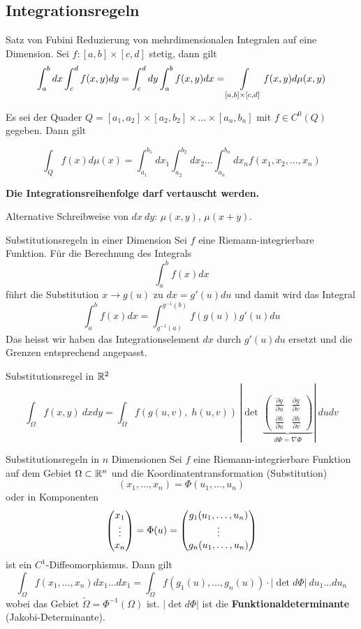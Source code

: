 \subsection{Integrationsregeln}

\begin{Satz}{Satz von Fubini}{}
    Reduzierung von mehrdimensionalen Integralen auf eine Dimension. Sei $f: [a,b] \times [c, d]$ stetig, dann gilt
    \[ \int_a^b dx \int_c^d f(x, y) dy = \int_c^d dy \int_a^b f(x, y) dx = \int\displaylimits_{[a,b] \times [c, d]} f(x, y) d\mu(x, y)   \]

    Es sei der Quader $Q = [a_1,a_2] \times [a_2, b_2] \times \dots \times [a_n, b_n]$ mit $f \in C^0(Q)$ gegeben. Dann gilt

    \[
        \int_Q f(x) d\mu(x) = \int_{a_1}^{b_1} dx_1 \int_{a_2}^{b_2} dx_2 \dots \int_{a_n}^{b_n} dx_n f(x_1, x_2,...,x_n)
    \]
    
    \textbf{Die Integrationsreihenfolge darf vertauscht werden.}
\end{Satz}

Alternative Schreibweise von $dx ~ dy$: $\mu(x, y)$, $\mu(x+y)$.

\begin{Satz}{Substitutionsregeln in einer Dimension}{}
    Sei $f$ eine Riemann-integrierbare Funktion. Für die Berechnung des Integrals
    \[
        \int_a^b f(x) dx
    \]
    führt die Substitution $x \to g(u)$ zu $dx = g'(u)du$ und damit wird das Integral
    \[
        \int_a^b f(x) dx = \int_{g^{-1}(a)}^{g^{-1}(b)} f(g(u)) g'(u) du
    \]
    Das heisst wir haben das Integrationselement $dx$ durch $g'(u)du$ ersetzt und die Grenzen entsprechend angepasst.
\end{Satz}

\begin{Satz}{Substitutionsregel in $\mathbb{R}^2$}{}
    \[
        \int_{\Omega} f(x,y) ~ dx dy = \int_{\widetilde{\Omega}} f(g(u, v), \; h(u, v)) \, 
		    \left\lvert\det \, \underbrace{\begin{pmatrix}
			    \frac{\partial g}{\partial u} & \frac{\partial g}{\partial v}\\
			    \frac{\partial h}{\partial u} & \frac{\partial h}{\partial v}
		    \end{pmatrix}}_{d\Phi = \nabla\Phi} \right\rvert
	    ~ du dv
    \]
\end{Satz}

\begin{Satz}{Substitutionsregeln in $n$ Dimensionen}{}
    Sei $f$ eine Riemann-integrierbare Funktion auf dem Gebiet $\Omega \subset \mathbb{R}^n$ und die Koordinatentransformation (Substitution)
    \[
    (x_1,\hdots,x_n) = \Phi(u_1, \hdots,  u_n)
    \]
    oder in Komponenten
    \[
        \begin{pmatrix} x_1 \\ \vdots \\ x_n \end{pmatrix}
        = \Phi(u)
        = \begin{pmatrix} g_1(u_1,\hdots,u_n) \\ \vdots \\ g_n(u_1,\hdots,u_n) \end{pmatrix}
    \]
    ist ein $C^1$-Diffeomorphismus. Dann gilt
    \[
        \int_\Omega f(x_1, \hdots, x_n)dx_1\hdots dx_1 = \int_{\widetilde{\Omega}} f(g_1(u), \hdots, g_n(u)) \cdot |\det d \Phi|\ du_1\hdots du_n
    \]
    wobei das Gebiet $\widetilde{\Omega} = \Phi^{-1}(\Omega)$ ist. $|\det d\Phi|$ ist die \textbf{Funktionaldeterminante} (Jakobi-Determinante).
\end{Satz}

